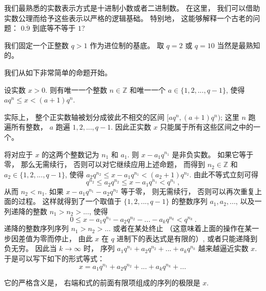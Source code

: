 


我们最熟悉的实数表示方式是十进制小数或者二进制数。 在这里， 我们可以借助实数公理而给予这些表示以严格的逻辑基础。 特别地， 这能够解释一个古老的问题： $0.\dot{9}$ 到底等不等于 $1$?

我们固定一个正整数 $q>1$ 作为进位制的基底。 取 $q=2$ 或 $q=10$ 当然是最熟知的。

我们从如下非常简单的命题开始。 
\begin{lemma}{}
设实数 $x>0$. 则有唯一一个整数 $n\in\mathbb{Z}$ 和唯一一个 $a\in\{1,2,...,q-1\}$, 使得 $aq^n\leq x<(a+1)q^{n}$.
\end{lemma}

实际上， 整个正实数轴被划分成彼此不相交的区间 $[aq^n,(a+1)q^{n})$; 这里 $n$ 跑遍所有整数， $a$ 跑遍 $1,2,...,q-1$. 因此正实数 $x$ 只能属于所有这些区间之中的一个。 

将对应于 $x$ 的这两个整数记为 $n_1$ 和 $a_1$. 则 $x-a_1q^{n_1}$ 是非负实数。 如果它等于零， 那么无需续行， 否则可以对它继续应用上述命题， 而得到 $n_2\in\mathbb{Z}$ 和 $a_2\in\{1,2,...,q-1\}$, 使得 $a_2q^{n_2}\leq x-a_1q^{n_1}<(a_2+1)q^{n_2}$. 由此不等式立刻可得
\[
q^{n_2}\leq a_2q^{n_2}\leq x-a_1q^{n_1}<q^{n_1}~,
\]
从而 $n_2<n_1$. 如果 $x-a_1q^{n_1}-a_2q^{n_2}$ 等于零， 则无需续行， 否则可以再次重复上面的过程。 这样就得到了一个取值于 $\{1,2,...,q-1\}$ 的整数序列 $a_1,a_2,...$, 以及一列递降的整数 $n_1>n_2>...$, 使得
\[ 
0\leq x-a_1q^{n_1}-a_2q^{n_2}-...-a_kq^{n_k}<q^{n_k}~.
\]
递降的整数序列序列 $n_1>n_2>...$ 或者在某处终止 （这意味着上面的操作在某一步因差值为零而停止， 由此 $x$ 在 $q$ 进制下的表达式是有限的）, 或者只能递降到负无穷。 因此当 $k\to\infty$ 时， 序列 $a_1q^{n_1}+a_2q^{n_2}+...+a_kq^{n_k}$ 越来越逼近实数 $x$. 于是可以写下如下的形式等式：
\begin{equation}
x=a_1q^{n_1}+a_2q^{n_2}+...+a_kq^{n_k}+... ~
\end{equation}


它的严格含义是， 右端和式的前面有限项组成的序列的极限是 $x$.
